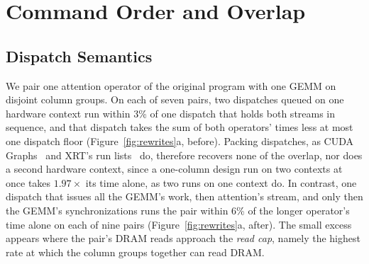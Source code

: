 \section{Command Order and Overlap}
\label{sec:motivation}

\subsection{Dispatch Semantics}
\label{subsec:semantics}

We pair one attention operator of the original program with one GEMM on disjoint column groups.
On each of seven pairs, two dispatches queued on one hardware context run within 3\% of one dispatch that holds both streams in sequence, and that dispatch takes the sum of both operators' times less at most one dispatch floor (Figure~\ref{fig:rewrites}a, before).
Packing dispatches, as CUDA Graphs~\citep{nvidia-cudagraphs} and XRT's run lists~\citep{xrt-repo} do, therefore recovers none of the overlap, nor does a second hardware context, since a one-column design run on two contexts at once takes $1.97\times$ its time alone, as two runs on one context do.
In contrast, one dispatch that issues all the GEMM's work, then attention's stream, and only then the GEMM's synchronizations runs the pair within 6\% of the longer operator's time alone on each of nine pairs (Figure~\ref{fig:rewrites}a, after).
The small excess appears where the pair's DRAM reads approach the \emph{read cap}, namely the highest rate at which the column groups together can read DRAM.

